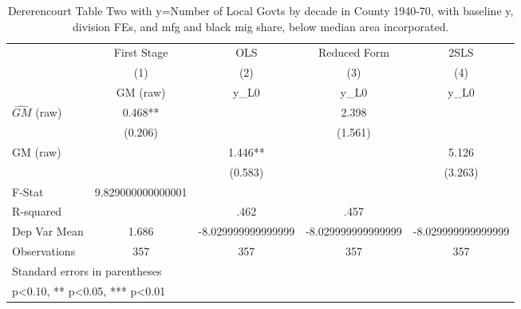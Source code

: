 \begin{table}[htbp]\centering
\def\sym#1{\ifmmode^{#1}\else\(^{#1}\)\fi}
\caption{Dererencourt Table Two with y=Number of Local Govts by decade in County 1940-70, with baseline y, division FEs, and mfg and black mig share, below median area incorporated.}
\begin{tabular}{l*{4}{c}}
\toprule
                    & First Stage   &         OLS   &Reduced Form   &        2SLS   \\
                    &\multicolumn{1}{c}{(1)}&\multicolumn{1}{c}{(2)}&\multicolumn{1}{c}{(3)}&\multicolumn{1}{c}{(4)}\\
                    &\multicolumn{1}{c}{GM  (raw)}&\multicolumn{1}{c}{y\_L0}&\multicolumn{1}{c}{y\_L0}&\multicolumn{1}{c}{y\_L0}\\
\midrule
$\hat{GM}$ (raw)    &       0.468** &               &       2.398   &               \\
                    &     (0.206)   &               &     (1.561)   &               \\
\addlinespace
GM  (raw)           &               &       1.446** &               &       5.126   \\
                    &               &     (0.583)   &               &     (3.263)   \\
\midrule
F-Stat              &9.829000000000001   &               &               &               \\
R-squared           &               &        .462   &        .457   &               \\
Dep Var Mean        &       1.686   &-8.029999999999999   &-8.029999999999999   &-8.029999999999999   \\
Observations        &         357   &         357   &         357   &         357   \\
\bottomrule
\multicolumn{5}{l}{\footnotesize Standard errors in parentheses}\\
\multicolumn{5}{l}{\footnotesize * p<0.10, ** p<0.05, *** p<0.01}\\
\end{tabular}
\end{table}
